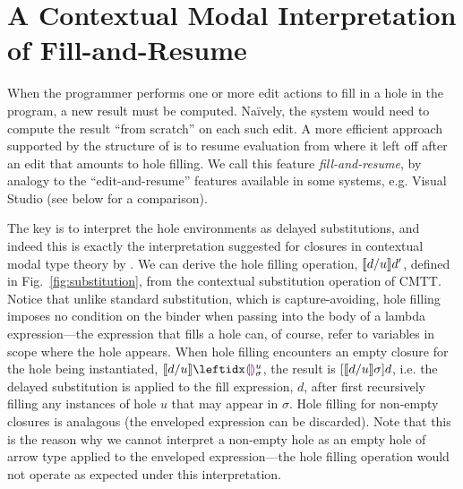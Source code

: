 \newcommand{\commutativitySec}{A Contextual Modal Interpretation of Fill-and-Resume}
\section{\protect\commutativitySec}
\label{sec:resumption}


When the programmer performs one or more edit actions to fill in a hole in the program, a new result must be computed. Na\"ively, the system would need to compute the result ``from scratch'' on each such edit. A more efficient approach supported by the structure of \HazelnutLive is to resume evaluation from where it left off after an edit that amounts to hole filling. We call this feature \emph{fill-and-resume}, by analogy to the ``edit-and-resume'' features available in some systems, e.g. Visual Studio (see below for a comparison).

The key is to interpret the hole environments as delayed substitutions, and indeed this is exactly the interpretation suggested for closures in contextual modal type theory by \citet{Nanevski2008}. We can derive the hole filling operation, $\llbracket d / u\rrbracket d'$, defined in Fig.~\ref{fig:substitution}, from the contextual substitution operation of CMTT. Notice that unlike standard substitution, which is capture-avoiding, hole filling imposes no condition on the binder when passing into the body of a lambda expression---the expression that fills a hole can, of course, refer to variables in scope where the hole appears. When hole filling encounters an empty closure for the hole being instantiated, $\instantiate{d}{u}{\dehole{u}{\sigma}{}}$, the result is $[\llbracket d / u\rrbracket \sigma]d$, i.e. the delayed substitution is applied to the fill expression, $d$, after first recursively filling any instances of hole $u$ that may appear in $\sigma$. Hole filling for non-empty closures is analagous (the enveloped expression can be discarded). Note that this is the reason why we cannot interpret a non-empty hole as an empty hole of arrow type applied to the enveloped expression---the hole filling operation would not operate as expected under this interpretation.

